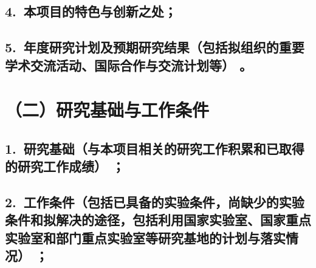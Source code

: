 \documentclass[12pt,UTF8,AutoFakeBold=2.5,a4paper]{ctexart} %
\begin{document}


\subsection{\hspace{1.45em}  4.~{\bfseries 本项目的特色与创新之处；}}




\subsection{\hspace{1.5em}  5.~{\bfseries 年度研究计划及预期研究结果}（包括拟组织的重要学术交流活动、国际合作与交流计划等）\hspace{-14pt} 。}






\section{{\bfseries（二）研究基础与工作条件}} %
\subsection{\hspace{1.45em}  1.~{\bfseries 研究基础}（与本项目相关的研究工作积累和已取得的研究工作成绩）\hspace{-14pt} ；}




\subsection{\hspace{1.45em}  2.~{\bfseries 工作条件}（包括已具备的实验条件，尚缺少的实验条件和拟解决的途径，包括利用国家实验室、国家重点实验室和部门重点实验室等研究基地的计划与落实情况）\hspace{-14pt}  ；}


\end{document}
